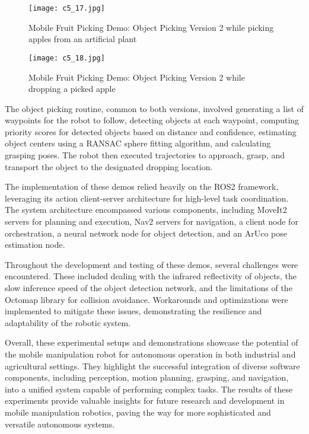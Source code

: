 \begin{figure}[t]
    \centering
    \texttt{[image: c5\_17.jpg]}
    \caption{Mobile Fruit Picking Demo: Object Picking Version 2 while picking apples from an artificial plant}
    \label{fig:demo2_1}
\end{figure}

\begin{figure}[t]
    \centering
    \texttt{[image: c5\_18.jpg]}
    \caption{Mobile Fruit Picking Demo: Object Picking Version 2 while dropping a picked apple}
    \label{fig:demo2_2}
\end{figure}

The object picking routine, common to both versions, involved generating a list of waypoints for the robot to follow,
detecting objects at each waypoint, computing priority scores for detected objects based on distance and confidence, 
estimating object centers using a RANSAC sphere fitting algorithm, and calculating grasping poses. The robot then 
executed trajectories to approach, grasp, and transport the object to the designated dropping location.

The implementation of these demos relied heavily on the ROS2 framework, leveraging its action client-server 
architecture for high-level task coordination. The system architecture encompassed various components, including 
MoveIt2 servers for planning and execution, Nav2 servers for navigation, a client 
node for orchestration, a neural network node for object detection, and an ArUco pose estimation node.

Throughout the development and testing of these demos, several challenges were encountered. These included 
dealing with the infrared reflectivity of objects, the slow inference speed of the object detection network, 
and the limitations of the Octomap library for collision avoidance. Workarounds and optimizations were 
implemented to mitigate these issues, demonstrating the resilience and adaptability of the robotic system.

Overall, these experimental setups and demonstrations showcase the potential of the mobile manipulation robot
for autonomous operation in both industrial and agricultural settings. They highlight the successful integration 
of diverse software components, including perception, motion planning, grasping, and navigation, into a 
unified system capable of performing complex tasks.  The results of these experiments provide valuable insights
for future research and development in mobile manipulation robotics, paving the way for more sophisticated 
and versatile autonomous systems.

